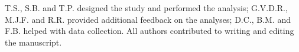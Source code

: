 \label{Foodweb}

\contributions%
{ T.S., S.B. and T.P. designed the study and performed the analysis; G.V.D.R., M.J.F. and R.R. provided additional feedback on the analyses; D.C., B.M. and F.B. helped with data collection. All authors contributed to writing and editing the manuscript. \\[1cm]
}


